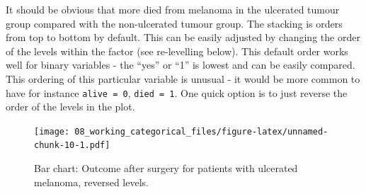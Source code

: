 \documentclass[
  12pt,
  krantz2]{krantz}
\makeatletter
\newenvironment{Shaded}{\begin{snugshade}}{\end{snugshade}}
\newcommand{\DataTypeTok}[1]{\textcolor[rgb]{0.13,0.29,0.53}{#1}}
\newcommand{\KeywordTok}[1]{\textcolor[rgb]{0.13,0.29,0.53}{\textbf{#1}}}
\newcommand{\NormalTok}[1]{#1}
\newcommand{\OperatorTok}[1]{\textcolor[rgb]{0.81,0.36,0.00}{\textbf{#1}}}
\newcommand{\OtherTok}[1]{\textcolor[rgb]{0.56,0.35,0.01}{#1}}
\newcommand{\StringTok}[1]{\textcolor[rgb]{0.31,0.60,0.02}{#1}}
\newenvironment{kframe}{%
\medskip{}
\setlength{\fboxsep}{.8em}
 \def\at@end@of@kframe{}%
 \ifinner\ifhmode%
  \def\at@end@of@kframe{\end{minipage}}%
  \begin{minipage}{\columnwidth}%
 \fi\fi%
 \def\FrameCommand##1{\hskip\@totalleftmargin \hskip-\fboxsep
 \colorbox{shadecolor}{##1}\hskip-\fboxsep
     \hskip-\linewidth \hskip-\@totalleftmargin \hskip\columnwidth}%
 \MakeFramed {\advance\hsize-\width
   \@totalleftmargin\z@ \linewidth\hsize
   \@setminipage}}%
 {\par\unskip\endMakeFramed%
 \at@end@of@kframe}
\renewenvironment{Shaded}{\begin{kframe}}{\end{kframe}}
\makeatother
\begin{document}
It should be obvious that more died from melanoma in the ulcerated tumour group compared with the non-ulcerated tumour group.
The stacking is orders from top to bottom by default.
This can be easily adjusted by changing the order of the levels within the factor (see re-levelling below).
This default order works well for binary variables - the ``yes'' or ``1'' is lowest and can be easily compared.
This ordering of this particular variable is unusual - it would be more common to have for instance \texttt{alive\ =\ 0}, \texttt{died\ =\ 1}.
One quick option is to just reverse the order of the levels in the plot.

\begin{Shaded}
\end{Shaded}

\begin{figure}
\centering
\texttt{[image: 08\_working\_categorical\_files/figure-latex/unnamed-chunk-10-1.pdf]}
\caption{\label{fig:unnamed-chunk-10}Bar chart: Outcome after surgery for patients with ulcerated melanoma, reversed levels.}
\end{figure}
\end{document}
